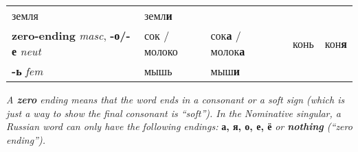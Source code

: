 \begin{longtable}[]{@{}llllll@{}}
\begin{minipage}[t]{0.16\columnwidth}
земля\strut
\end{minipage} & \begin{minipage}[t]{0.16\columnwidth}\raggedright\strut
земл\textbf{и}\strut
\end{minipage}\tabularnewline
\begin{minipage}[t]{0.16\columnwidth}\raggedright\strut
\textbf{zero-ending} \emph{masc}, \textbf{-о/-е} \emph{neut}\strut
\end{minipage} & \begin{minipage}[t]{0.16\columnwidth}\raggedright\strut
сок / молоко\strut
\end{minipage} & \begin{minipage}[t]{0.16\columnwidth}\raggedright\strut
сок\textbf{а} / молок\textbf{а}\strut
\end{minipage} & \begin{minipage}[t]{0.16\columnwidth}\raggedright\strut
\strut
\end{minipage} & \begin{minipage}[t]{0.16\columnwidth}\raggedright\strut
конь\strut
\end{minipage} & \begin{minipage}[t]{0.16\columnwidth}\raggedright\strut
кон\textbf{я}\strut
\end{minipage}\tabularnewline
\begin{minipage}[t]{0.16\columnwidth}\raggedright\strut
\textbf{-ь} \emph{fem}\strut
\end{minipage} & \begin{minipage}[t]{0.16\columnwidth}\raggedright\strut
мышь\strut
\end{minipage} & \begin{minipage}[t]{0.16\columnwidth}\raggedright\strut
мыш\textbf{и}\strut
\end{minipage} & \begin{minipage}[t]{0.16\columnwidth}\raggedright\strut
\strut
\end{minipage} & \begin{minipage}[t]{0.16\columnwidth}\raggedright\strut
\strut
\end{minipage} & \begin{minipage}[t]{0.16\columnwidth}\raggedright\strut
\strut
\end{minipage}\tabularnewline
\bottomrule
\end{longtable}

\emph{A \textbf{zero} ending means that the word ends in a consonant or
a soft sign (which is just a way to show the final consonant is
``soft''). In the Nominative singular, a Russian word can only have the
following endings:} \textbf{а, я, о, е, ё} \emph{or \textbf{nothing}
(``zero ending'').}

